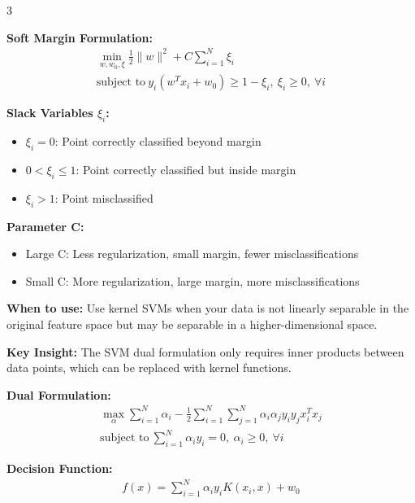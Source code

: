 \documentclass[10pt,landscape]{article}
\begin{document}
\begin{multicols}{3}
\begin{tcolorbox}[breakable, title=4.1 Maximum Margin Classification, colback=svm]
\textbf{Soft Margin Formulation:}
\begin{align}
\min_{w,w_0,\xi} \frac{1}{2}\|w\|^2 + C\sum_{i=1}^N \xi_i \\
\text{subject to}~y_i(w^Tx_i + w_0) \geq 1 - \xi_i,~\xi_i \geq 0,~\forall i
\end{align}

\textbf{Slack Variables $\xi_i$:}
\begin{itemize}[leftmargin=*,noitemsep,topsep=0pt]
    \item $\xi_i = 0$: Point correctly classified beyond margin
    \item $0 < \xi_i \leq 1$: Point correctly classified but inside margin
    \item $\xi_i > 1$: Point misclassified
\end{itemize}

\textbf{Parameter C:}
\begin{itemize}[leftmargin=*,noitemsep,topsep=0pt]
    \item Large C: Less regularization, small margin, fewer misclassifications
    \item Small C: More regularization, large margin, more misclassifications
\end{itemize}
\end{tcolorbox}

\begin{tcolorbox}[breakable, title=4.2 The Kernel Trick, colback=svm]
\textbf{When to use:} Use kernel SVMs when your data is not linearly separable in the original feature space but may be separable in a higher-dimensional space.

\textbf{Key Insight:} The SVM dual formulation only requires inner products between data points, which can be replaced with kernel functions.

\textbf{Dual Formulation:}
\begin{align}
\max_{\alpha} \sum_{i=1}^N \alpha_i - \frac{1}{2}\sum_{i=1}^N\sum_{j=1}^N \alpha_i\alpha_j y_i y_j x_i^T x_j \\
\text{subject to}~\sum_{i=1}^N \alpha_i y_i = 0,~\alpha_i \geq 0,~\forall i
\end{align}

\textbf{Decision Function:}
\begin{align}
f(x) = \sum_{i=1}^N \alpha_i y_i K(x_i, x) + w_0
\end{align}


\end{tcolorbox}
\end{multicols}
\end{document}
